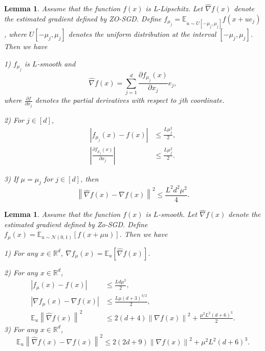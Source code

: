 \documentclass{article}
\newcommand*{\R}{\mathbb{R}}
\newcommand*{\E}{\mathbb{E}}
\newcommand{\norm}[1]{\left\lVert#1\right\rVert}
\newcommand{\abs}[1]{\left|#1\right|}
\newtheorem{lemma}[theorem]{Lemma}
\theoremstyle{definition}
\theoremstyle{remark}
\begin{document}
\begin{lemma}
Assume that the function $f(x)$ is L-Lipschitz. Let $\hat{\nabla} f(x)$ denote the estimated gradient defined by {\color{red} ZO-SGD}. Define $f_{\mu_j} = \E_{u\sim U[-\mu_j,\mu_j]}f(x+ue_j)$, where $U[-\mu_j,\mu_j]$ denotes the uniform distribution at the interval $[-\mu_j,\mu_j]$. Then we have 

1) $f_{\mu_j}$ is $L$-smooth and 
\begin{equation}
\hat{\nabla} f(x) = \sum_{j=1}^d \frac{\partial f_{\mu_j}(x)}{\partial x_j}e_j,
\end{equation}
where $\frac{\partial f}{\partial x_j}$ denotes the partial derivatives with respect to $j$th coordinate.

2) For $j\in [d]$, 
\begin{equation}
\begin{split}
\abs{f_{\mu_j}(x)-f(x)}&\leq \frac{L\mu_j^2}{2},\\
\abs{\frac{\partial f_{\mu_j}(x)}{\partial x_j}}&\leq\frac{L\mu_j^2}{2}. 
\end{split}
\end{equation}

3) If $\mu=\mu_j$ for $j\in [d]$, then 
\begin{equation}
\norm{\hat{\nabla} f(x) - \nabla f(x)}^2 \leq \frac{L^2d^2\mu^2}{4}.
\end{equation}
\end{lemma}
\begin{lemma}
Assume that the function $f(x)$ is $L$-smooth. Let $\hat{\nabla} f(x)$ denote the estimated gradient defined by {\color{red} Zo-SGD}. Define $f_{\mu}(x) = \E_{u\sim\mathcal{N}(0,1)}[f(x+\mu u)]$. Then we have
 
1) For any $x\in\R^d$, $\nabla f_{\mu}(x) = \E_u[\hat{\nabla}f(x)]$.

2) For any $x\in\R^d$,
\begin{equation}
\begin{split}
\abs{f_{\mu}(x)-f(x)}&\leq \frac{Ld\mu^2}{2},\\
\abs{\nabla f_{\mu}(x)- \nabla f(x)}&\leq \frac{L\mu(d+3)^{3/2}}{2},\\
\E_u\norm{\hat{\nabla} f(x)}^2 &\leq 2(d+4) \norm{{\nabla} f(x)}^2 + \frac{\mu^2L^2(d+6)^3}{2}.
\end{split}
\end{equation}
3) For any $x\in\R^d$, 
\begin{equation}
\E_u\norm{\hat{\nabla}f(x) - {\nabla}f(x)}^2 \leq 2(2d+9)\norm{\nabla f(x)}^2+\mu^2L^2(d+6)^3.
\end{equation}
\end{lemma}
\end{document}

